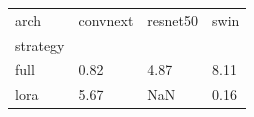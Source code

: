 \begin{tabular}{llll}
\toprule
arch & convnext & resnet50 & swin \\
strategy &  &  &  \\
\midrule
full & 0.82 & 4.87 & 8.11 \\
lora & 5.67 & NaN & 0.16 \\
\bottomrule
\end{tabular}
